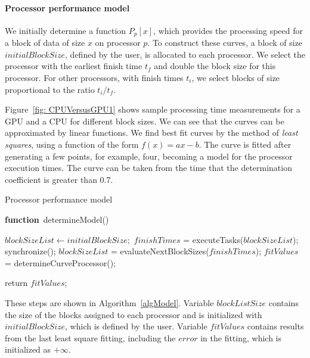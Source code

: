 \documentclass[journal]{IEEEtran}
\begin{document}
\vspace{0.2cm}
\paragraph*{Processor performance model} We initially determine a function
$P_p[x]$, which provides the processing speed for a block of data of size $x$ on
processor $p$. To construct these curves, a block of size $initialBlockSize$,
defined by the user, is allocated to each processor. We select the processor
with the earliest finish time $t_f$ and double the block size for this
processor. For other processors, with finish times $t_i$, we select blocks of
size proportional to the ratio $t_i$/$t_f$.

Figure~\ref{fig: CPUVersusGPU1} shows sample processing time measurements for a
GPU and a CPU for different block sizes. We can see that the curves can be
approximated by linear functions. We find best fit curves by the method of
\textit{least squares}, using a function of the form $f(x) = a x - b$. The
curve is fitted after generating a few points, for example, four, becoming a
model for the processor execution times. The curve can be taken from the time that the determination coefficient is greater than 0.7.


\begin{algorithm}

\caption{Processor performance model}
\label{algModel}

\begin{algorithmic}		

\STATE \textbf{function}~determineModel()

\STATE $blockSizeList \leftarrow initialBlockSize;$
		\STATE $finishTimes$ = executeTasks($blockSizeList$);
                \STATE synchronize();
	        \STATE $blockSizeList$ = evaluateNextBlockSizes($finishTimes$);
		\STATE $fitValues$ = determineCurveProcessor();
\ENDWHILE

return $fitValues$;

\end{algorithmic}
\end{algorithm}

These steps are shown in Algorithm~\ref{algModel}. Variable $blockListSize$
contains the size of the blocks assigned to each processor and is initialized
with $initialBlockSize$, which is defined by the user. Variable $fitValues$
contains results from the last least square fitting, including the $error$ in
the fitting, which is initialized as $+\infty$.
\end{document}
